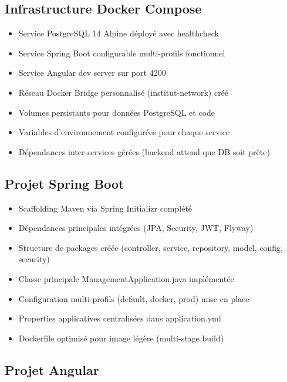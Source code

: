 \documentclass[12pt,a4paper]{report}
\begin{document}
\subsection{Infrastructure Docker Compose}

\begin{itemize}[itemsep=0.4em]
    \item  Service PostgreSQL 14 Alpine déployé avec healthcheck
    \item  Service Spring Boot configurable multi-profils fonctionnel
    \item  Service Angular dev server sur port 4200
    \item  Réseau Docker Bridge personnalisé (institut-network) créé
    \item  Volumes persistants pour données PostgreSQL et code
    \item  Variables d'environnement configurées pour chaque service
    \item  Dépendances inter-services gérées (backend attend que DB soit prête)
\end{itemize}

\subsection{Projet Spring Boot}

\begin{itemize}[itemsep=0.4em]
    \item  Scaffolding Maven via Spring Initializr complété
    \item  Dépendances principales intégrées (JPA, Security, JWT, Flyway)
    \item  Structure de packages créée (controller, service, repository, model, config, security)
    \item  Classe principale ManagementApplication.java implémentée
    \item  Configuration multi-profils (default, docker, prod) mise en place
    \item  Properties applicatives centralisées dans application.yml
    \item  Dockerfile optimisé pour image légère (multi-stage build)
\end{itemize}

\subsection{Projet Angular}
\end{document}
